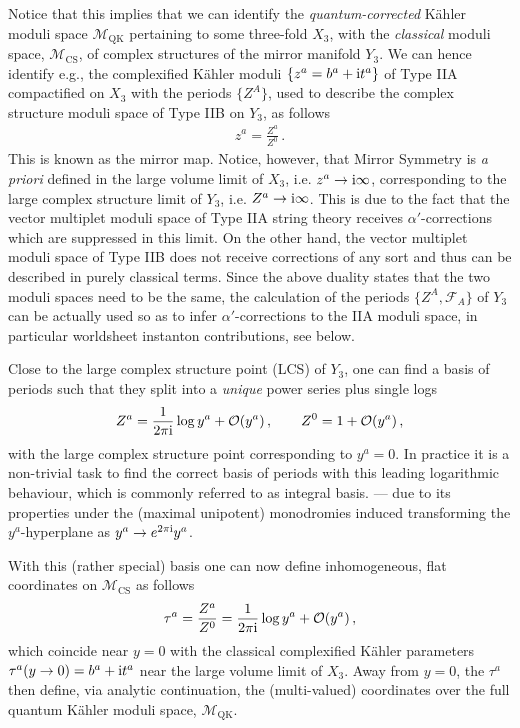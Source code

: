 %
Notice that this implies that we can identify the \emph{quantum-corrected} K\"ahler moduli space $\mathcal{M}_{\text{QK}}$ pertaining to some three-fold $X_3$, with the \emph{classical} moduli space, $\mathcal{M}_{\text{CS}}$, of complex structures of the mirror manifold $Y_3$. We can hence identify e.g., the complexified K\"ahler moduli $\{z^a = b^a + \text{i} t^a\}$ of Type IIA compactified on $X_3$ with the periods $\{Z^A\}$, used to describe the complex structure moduli space of Type IIB on $Y_3$, as follows
%
\begin{align}\label{mirrormap}
 z^a = \frac{Z^a}{Z^0}\, .
\end{align}
%
This is known as the mirror map. Notice, however, that Mirror Symmetry is \textit{a priori} defined in the large volume limit of $X_3$, i.e. $z^a \rightarrow \text{i} \infty$, corresponding to the large complex structure limit of $Y_3$, i.e. $Z^a \rightarrow \text{i} \infty$. This is due to the fact that the vector multiplet moduli space of Type IIA string theory receives $\alpha'$-corrections which are suppressed in this limit. On the other hand, the vector multiplet moduli space of Type IIB does not receive corrections of any sort and thus can be described in purely classical terms. Since the above duality states that the two moduli spaces need to be the same, the calculation of the periods $\{Z^A, \mathcal{F}_A\}$ of $Y_3$ can be actually used so as to infer $\alpha'$-corrections to the IIA moduli space, in particular worldsheet instanton contributions, see below. 

Close to the large complex structure point (LCS) of $Y_3$, one can find a basis of periods such that they split into a \textit{unique} power series plus single logs
%
\begin{align}\label{largecomplexperiods}
 Z^a = \frac{1}{2\pi \text{i} } \log y^a + \mathcal{O}(y^a) \, ,\qquad Z^0 = 1 + \mathcal{O}(y^a)\, ,
\end{align}
%
with the large complex structure point corresponding to $y^a=0$. In practice it is a non-trivial task to find the correct basis of periods with this leading logarithmic behaviour, which is commonly referred to as integral basis. --- due to its properties under the (maximal unipotent) monodromies induced transforming the $y^a$-hyperplane as $y^a\rightarrow e^{2\pi \text{i} }y^a$.

With this (rather special) basis one can now define inhomogeneous, flat coordinates on $\mathcal{M}_{\text{CS}}$ as follows 
%
\begin{align}\label{eq:coordinates}
 \tau^a = \frac{Z^a}{Z^0}=\frac{1}{2\pi \text{i} } \log y^a + \mathcal{O}(y^a)\, ,
\end{align}
%
which coincide near $y=0$ with the classical complexified K\"ahler parameters $\tau^a (y \to 0) = b^a + \text{i} t^a$ near the large volume limit of $X_3$. Away from $y=0$, the $\tau^a$ then define, via analytic continuation, the (multi-valued) coordinates over the full quantum K\"ahler moduli space, $\mathcal{M}_{\text{QK}}$.

